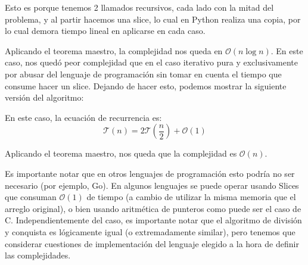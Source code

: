 Esto es porque tenemos 2 llamados recursivos, cada lado con la mitad del problema, y al partir hacemos una slice, lo cual en Python realiza una copia, por lo cual demora tiempo lineal en aplicarse en cada caso. 

Aplicando el teorema maestro, la complejidad nos queda en $\mathcal{O}\left(n \log n\right)$. En este caso, nos quedó peor complejidad que en el caso iterativo pura y exclusivamente por abusar del lenguaje de programación sin tomar en cuenta el tiempo que consume hacer un slice. Dejando de hacer esto, podemos mostrar la siguiente versión del algoritmo: 

En este caso, la ecuación de recurrencia es: 
\begin{equation*}
    \mathcal{T}(n) = 2 \mathcal{T}\left(\frac{n}{2}\right) + \mathcal{O}(1)
\end{equation*}

Aplicando el teorema maestro, nos queda que la complejidad es $\mathcal{O}\left(n\right)$.

Es importante notar que en otros lenguajes de programación esto podría no ser necesario (por ejemplo, Go). En algunos lenguajes se puede operar usando Slices que consuman $\mathcal{O}(1)$ de tiempo (a cambio de utilizar la misma memoria que el arreglo original), o bien usando aritmética de punteros como puede ser el caso de C. Independientemente del caso, es importante notar que el algoritmo de división y conquista es lógicamente igual (o extremadamente similar), pero tenemos que considerar cuestiones de implementación del lenguaje elegido a la hora de definir las complejidades. 
